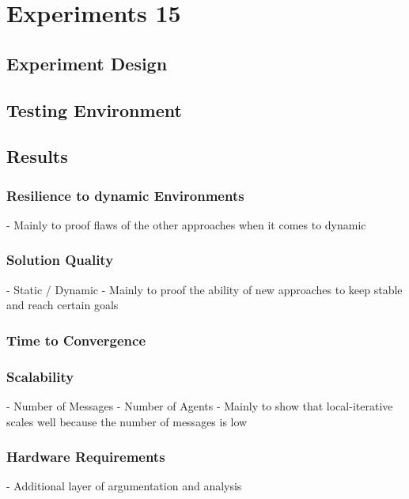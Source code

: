 \chapter{Experiments 15}
\section{Experiment Design}
\section{Testing Environment}
\section{Results}
\subsection{Resilience to dynamic Environments}
- Mainly to proof flaws of the other approaches when it comes to dynamic
\subsection{Solution Quality}
- Static / Dynamic
- Mainly to proof the ability of new approaches to keep stable and reach certain goals
\subsection{Time to Convergence}

\subsection{Scalability}
-  Number of Messages
- Number of Agents
- Mainly to show that local-iterative scales well because the number of messages is low
\subsection{Hardware Requirements}
- Additional layer of argumentation and analysis
